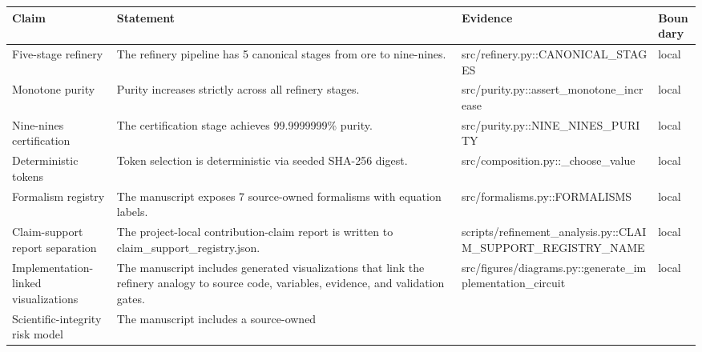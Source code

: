 \documentclass[
  english,
]{article}
\newcounter{none} %
\begin{document}
{\def\LTcaptype{none} %
\begin{longtable}[]{@{}
  >{\raggedright\arraybackslash}p{}
  >{\raggedright\arraybackslash}p{}
  >{\raggedright\arraybackslash}p{}
  >{\raggedright\arraybackslash}p{}@{}}
\toprule\noalign{}
\begin{minipage}[b]{\linewidth}\raggedright
Claim
\end{minipage} & \begin{minipage}[b]{\linewidth}\raggedright
Statement
\end{minipage} & \begin{minipage}[b]{\linewidth}\raggedright
Evidence
\end{minipage} & \begin{minipage}[b]{\linewidth}\raggedright
Boundary
\end{minipage} \\
\midrule\noalign{}
\endhead
\bottomrule\noalign{}
\endlastfoot
Five-stage refinery & The refinery pipeline has 5 canonical stages from
ore to nine-nines. & src/refinery.py::CANONICAL\_STAGES & local \\
Monotone purity & Purity increases strictly across all refinery stages.
& src/purity.py::assert\_monotone\_increase & local \\
Nine-nines certification & The certification stage achieves 99.9999999\%
purity. & src/purity.py::NINE\_NINES\_PURITY & local \\
Deterministic tokens & Token selection is deterministic via seeded
SHA-256 digest. & src/composition.py::\_choose\_value & local \\
Formalism registry & The manuscript exposes 7 source-owned formalisms
with equation labels. & src/formalisms.py::FORMALISMS & local \\
Claim-support report separation & The project-local contribution-claim
report is written to claim\_support\_registry.json. &
scripts/refinement\_analysis.py::CLAIM\_SUPPORT\_REGISTRY\_NAME &
local \\
Implementation-linked visualizations & The manuscript includes generated
visualizations that link the refinery analogy to source code, variables,
evidence, and validation gates. &
src/figures/diagrams.py::generate\_implementation\_circuit & local \\
Scientific-integrity risk model & The manuscript includes a source-owned

\end{longtable}}
\end{document}
